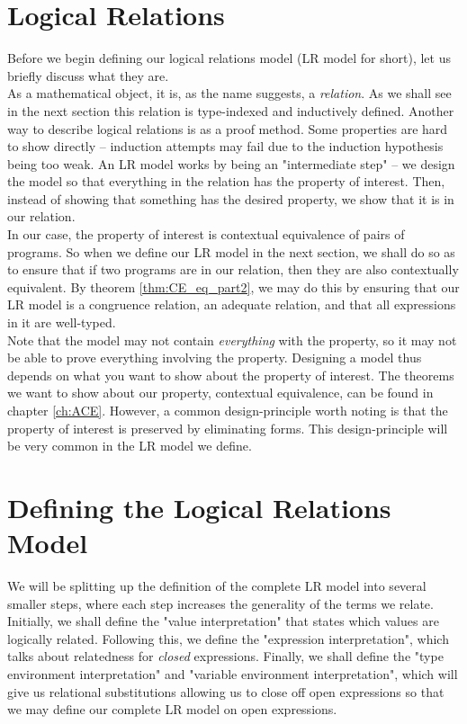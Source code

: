 \documentclass[a4paper, 11pt]{report}
\theoremstyle{definition}
\begin{document}
\section{Logical Relations}
Before we begin defining our logical relations model (LR model for short), let us briefly discuss what they are.\\
As a mathematical object, it is, as the name suggests, a \textit{relation}. As we shall see in the next section this relation is type-indexed and inductively defined.
Another way to describe logical relations is as a proof method. Some properties are hard to show directly – induction attempts may fail due to the induction hypothesis being too weak. An LR model works by being an "intermediate step" – we design the model so that everything in the relation has the property of interest. Then, instead of showing that something has the desired property, we show that it is in our relation.\\
In our case, the property of interest is contextual equivalence of pairs of programs. So when we define our LR model in the next section, we shall do so as to ensure that if two programs are in our relation, then they are also contextually equivalent. By theorem \ref{thm:CE_eq_part2}, we may do this by ensuring that our LR model is a congruence relation, an adequate relation, and that all expressions in it are well-typed.\\
Note that the model may not contain \textit{everything} with the property, so it may not be able to prove everything involving the property. Designing a model thus depends on what you want to show about the property of interest.
The theorems we want to show about our property, contextual equivalence, can be found in chapter \ref{ch:ACE}. However, a common design-principle worth noting is that the property of interest is preserved by eliminating forms. This design-principle will be very common in the LR model we define.


\section{Defining the Logical Relations Model}
We will be splitting up the definition of the complete LR model into several smaller steps, where each step increases the generality of the terms we relate.
Initially, we shall define the "value interpretation" that states which values are logically related. Following this, we define the "expression interpretation", which talks about relatedness for \textit{closed} expressions. Finally, we shall define the "type environment interpretation" and "variable environment interpretation", which will give us relational substitutions allowing us to close off open expressions so that we may define our complete LR model on open expressions.
\end{document}
